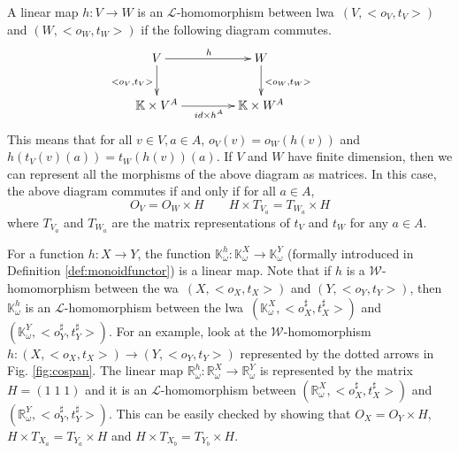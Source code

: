 \documentclass[3p]{elsarticle}
\newcommand{\fW}{\mathcal{W}}    %
\newcommand{\fL}{\mathcal{L}}    %
\newcommand{\vectproduct}{\times} %
\newcommand{\matrixproduct}{\times} %
\newcommand{\comp}{\circ}               %
\newcommand{\K}{\mathbb{K}}            %
\newcommand{\wa}{{\sc wa}}             %
\newcommand{\lwa}{{\sc lwa}}           %
\newcommand{\reals}{{\mathbb{R}}}              %
\begin{document}
\medskip
A linear map $h\colon  V\to W$ is an $\fL$-homomorphism between
\lwa\ $(V,<o_V,t_V>)$ and $(W,<o_W,t_W>)$ if the following diagram
commutes.
\[
\xymatrix@C=1.5cm{V \ar[d]_{<o_V,t_V>}\ar[r]^{h}& W\ar[d]^{<o_W,t_W>}\\
\K \vectproduct V^A \ar[r]_{id\vectproduct h^A}& \K \vectproduct
W^A}\ \ \ \ \ \ \ \ \
\]
This means that for all $ v \in V, a\in A$, $o_V(v)=o_W(h(v))$ and
$h(t_V(v)(a))=t_W(h(v))(a)$.
%
If $V$ and $W$ have finite dimension, then we can represent all the
morphisms of the above diagram as matrices. In this case, the above
diagram commutes if and only if for all $ a \in A$,
$$O_V=O_W \matrixproduct H \qquad H \matrixproduct T_{V_a} = T_{W_a}\matrixproduct H$$
where $T_{V_a}$ and $T_{W_a}$ are the matrix representations of $t_V$
and $t_W$ for any $a\in A$.

For a function $h\colon X \to Y$, the function $\K^h_{\omega} \colon \K^X_{\omega} \to
\K^Y_{\omega}$ (formally introduced in
Definition \ref{def:monoidfunctor}) is a linear map. %
Note that if $h$ is a $\fW$-homomorphism between the \wa\
$(X,<o_X,t_X>)$ and $(Y,<o_Y,t_Y>)$, then $\K^h_{\omega}$ is an
$\fL$-homomorphism between the \lwa\
$(\K^X_{\omega},<o_X^{\sharp},t_X^{\sharp}>)$ and
$(\K^Y_{\omega},<o_Y^{\sharp},t_Y^{\sharp}>)$.
%
For an example, look at the $\fW$-homomorphism $h\colon (X,
<o_X,t_X>) \to (Y, <o_Y,t_Y>)$ represented by the dotted arrows in
Fig. \ref{fig:cospan}. The linear map $\reals^h_{\omega} \colon \reals^X_{\omega} \to \reals^Y_{\omega}$ is
represented by the matrix $H=(1\;1\;1)$ and it is an
$\fL$-homomorphism between $(\reals^X_{\omega},<o_X^{\sharp},t_X^{\sharp}>)$ and
$(\reals^Y_{\omega},<o_Y^{\sharp},t_Y^{\sharp}>)$. This can be easily checked by
showing that $O_X=O_Y \matrixproduct H$, $H \matrixproduct T_{X_a} =
T_{Y_a}\matrixproduct H$ and $H \matrixproduct T_{X_b} =
T_{Y_b}\matrixproduct H$.

\medskip
\end{document}
